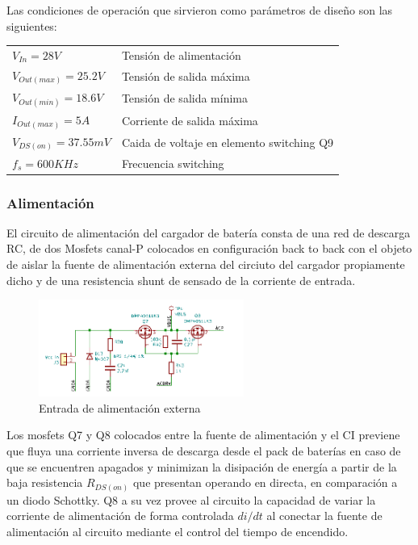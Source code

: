 \documentclass[10pt, a4paper]{report}
\begin{document}
Las condiciones de operación que sirvieron como parámetros de diseño son las
siguientes:

\begin{tabular}{ll}
    $V_{In}=28V$ &Tensión de alimentación \\
    $V_{Out (max)}=25.2V$ &Tensión de salida máxima\\
    $V_{Out (min)}=18.6V$ &Tensión de salida mínima\\
    $I_{Out (max)}=5A$ &Corriente de salida máxima\\
    $V_{DS (on)}=37.55mV$ &Caida de voltaje en elemento switching Q9\\
    $f_{s}=600 KHz$ &Frecuencia switching\\
\end{tabular}

\subsubsection{Alimentación}

El circuito de alimentación del cargador de batería consta de una red de descarga
RC, de dos Mosfets canal-P colocados en configuración back to back con el objeto de
aislar la fuente de alimentación externa del circiuto del cargador propiamente
dicho y de una resistencia shunt de sensado de la corriente de entrada. 

\begin{figure}[h!]
    \begin{center}
	\includegraphics[width=0.6\textwidth]{hardware/bat_charger/bc_input.png}
	\caption{Entrada de alimentación externa}
	\label{fig:cb_input}
    \end{center}
\end{figure}
\FloatBarrier

Los mosfets Q7 y Q8 colocados entre la fuente de alimentación y el \acrshort{CI}
previene que fluya una corriente inversa de descarga desde el pack de baterías
en caso de que se encuentren apagados y minimizan la disipación de energía a
partir de la baja resistencia $R_{DS(on)}$ que presentan operando en directa, en
comparación a un diodo Schottky. Q8 a su vez provee al circuito la capacidad de
variar la corriente de alimentación de forma controlada $di/dt$ al conectar la
fuente de alimentación al circuito mediante el control del tiempo de encendido.
    
\end{document}
